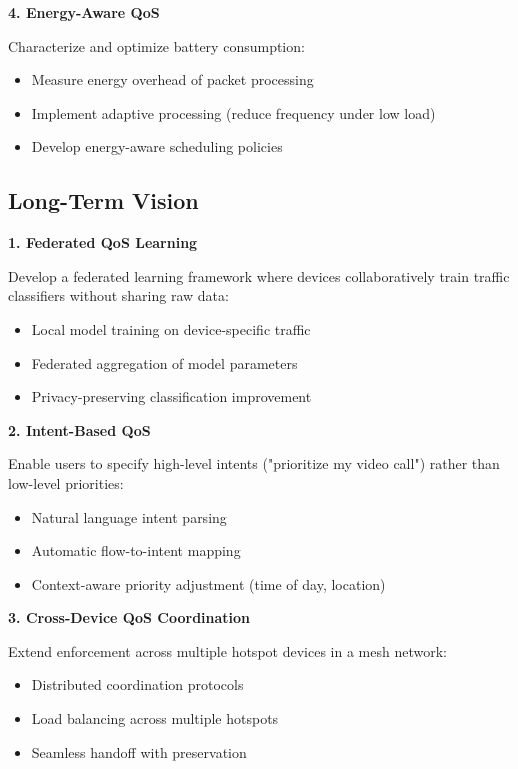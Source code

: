 \textbf{4. Energy-Aware QoS}

Characterize and optimize battery consumption:
\begin{itemize}
    \item Measure energy overhead of packet processing
    \item Implement adaptive processing (reduce frequency under low load)
    \item Develop energy-aware scheduling policies
\end{itemize}

\subsection{Long-Term Vision}

\textbf{1. Federated QoS Learning}

Develop a federated learning framework where devices collaboratively train traffic classifiers without sharing raw data:
\begin{itemize}
    \item Local model training on device-specific traffic
    \item Federated aggregation of model parameters
    \item Privacy-preserving classification improvement
\end{itemize}

\textbf{2. Intent-Based QoS}

Enable users to specify high-level intents ("prioritize my video call") rather than low-level priorities:
\begin{itemize}
    \item Natural language intent parsing
    \item Automatic flow-to-intent mapping
    \item Context-aware priority adjustment (time of day, location)
\end{itemize}

\textbf{3. Cross-Device QoS Coordination}

Extend \qos enforcement across multiple hotspot devices in a mesh network:
\begin{itemize}
    \item Distributed \qos coordination protocols
    \item Load balancing across multiple hotspots
    \item Seamless handoff with \qos preservation
\end{itemize}

